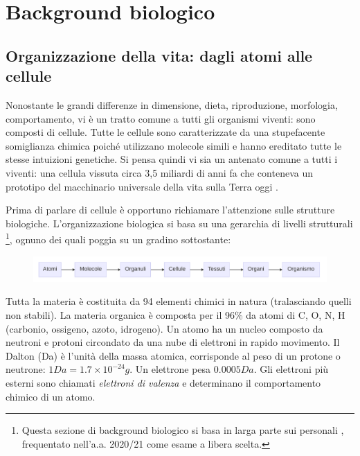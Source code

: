 \clearpage

\section{Background biologico}
\subsection{Organizzazione della vita: dagli atomi alle cellule}
Nonostante le grandi differenze in dimensione, dieta, riproduzione, morfologia, comportamento, vi è un tratto comune a tutti gli organismi viventi: sono composti di cellule. Tutte le cellule sono caratterizzate da una stupefacente somiglianza chimica poiché utilizzano molecole simili e hanno ereditato tutte le stesse intuizioni genetiche. Si pensa quindi vi sia un antenato comune a tutti i viventi: una cellula vissuta circa 3,5 miliardi di anni fa che conteneva un prototipo del macchinario universale della vita sulla Terra oggi \supercite{alberts2018essential}. \\

\par Prima di parlare di cellule è opportuno richiamare l'attenzione sulle strutture biologiche. L'organizzazione biologica si basa su una gerarchia di livelli strutturali \footnote{Questa sezione di background biologico si basa in larga parte sui personali , frequentato nell'a.a. 2020/21 come esame a libera scelta.}, ognuno dei quali poggia su un gradino sottostante: 

\begin{figure}[h]
	\centering
	\includegraphics[scale=0.45] {images/strutture_biologiche.png}
\end{figure}


\par Tutta la materia è costituita da 94 elementi chimici in natura (tralasciando quelli non stabili). La materia organica è composta per il 96\% da atomi di C, O, N, H (carbonio, ossigeno, azoto, idrogeno). Un atomo ha un nucleo composto da neutroni e protoni circondato da una nube di elettroni in rapido movimento. Il Dalton (Da) è l'unità della massa atomica, corrisponde al peso di un protone o neutrone: $1 Da = 1.7 \times 10^{-24}g$. Un elettrone pesa $0.0005 Da$. Gli elettroni più esterni sono chiamati \textit{elettroni di valenza} e determinano il comportamento chimico di un atomo.

